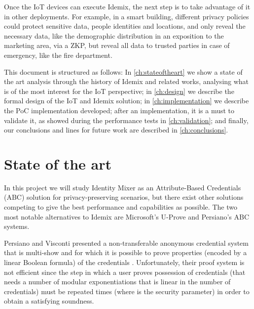 \documentclass[journal]{IEEEtran}
\begin{document}
Once the IoT devices can execute Idemix, the next step is to take advantage of it in other deployments. For example, in a smart building, different privacy policies could protect sensitive data, people identities and locations, and only reveal the necessary data, like the demographic distribution in an exposition to the marketing area, via a ZKP, but reveal all data to trusted parties in case of emergency, like the fire department. 

\hfil


This document is structured as follows: In \autoref{ch:stateoftheart} we show a state of the art analysis through the history of Idemix and related works, analysing what is of the most interest for the IoT perspective; in \autoref{ch:design} we describe the formal design of the IoT and Idemix solution; in \autoref{ch:implementation} we describe the PoC implementation developed; after an implementation, it is a must to validate it, as showed during the performance tests in \autoref{ch:validation}; and finally, our conclusions and lines for future work are described in \autoref{ch:conclusions}.



\section{State of the art}\label{ch:stateoftheart}

In this project we will study Identity Mixer as an Attribute-Based Credentials (ABC) solution for privacy-preserving scenarios, but there exist other solutions competing to give the best performance and capabilities as possible. The two most notable alternatives to Idemix are Microsoft's U-Prove and Persiano's ABC systems.




Persiano and Visconti presented a non-transferable anonymous
credential system that is multi-show and for which it is possible to prove
properties (encoded by a linear Boolean formula) of the credentials \cite{book:185217}. Unfortunately, their proof system is not efficient since the step in which a user proves
possession of credentials (that needs a number of modular exponentiations that
is linear in the number of credentials) must be repeated times (where is the
security parameter) in order to obtain a satisfying soundness.



\end{document}
